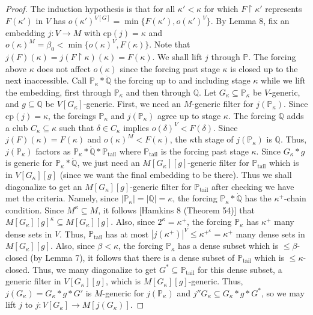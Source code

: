 \documentclass[10pt,leqno]{amsart}
\begin{document}
\begin{proof}
The induction hypothesis is that for all $\kappa' < \kappa$ for which $F \upharpoonright \kappa'$ represents $F(\kappa')$ in $V$ has $o(\kappa')^{V[G]} = \min\{F(\kappa'), o(\kappa')^V\}$. By Lemma 8, fix an embedding $j:V \to M$ with cp$(j) = \kappa$ and $o(\kappa)^M = \beta_0 < \min\{o(\kappa)^V,F(\kappa)\}$. Note that $j(F)(\kappa) = j(F\upharpoonright \kappa)(\kappa) = F(\kappa)$. We shall lift $j$ through $\mathbb{P}$. The forcing above $\kappa$ does not affect $o(\kappa)$ since the forcing past stage $\kappa$ is closed up to the next inaccessible. Call $\mathbb{P}_{\kappa}*\dot{\mathbb{Q}}$ the forcing up to and including stage $\kappa$ while we lift the embedding, first through $\mathbb{P}_{\kappa}$ and then through $\mathbb{Q}$. Let $G_{\kappa} \subseteq \mathbb{P}_{\kappa}$ be $V$-generic, and $g \subseteq \mathbb{Q}$ be $V[G_{\kappa}]$-generic. First, we need an $M$-generic filter for $j(\mathbb{P}_{\kappa})$. Since cp$(j) = \kappa$, the forcings $\mathbb{P}_{\kappa}$ and $j(\mathbb{P}_{\kappa})$ agree up to stage $\kappa$. The forcing $\mathbb{Q}$ adds a club $C_{\kappa} \subseteq \kappa$ such that $\delta \in C_{\kappa}$ implies $o(\delta)^V < F(\delta)$. Since $j(F)(\kappa) = F(\kappa)$ and $o(\kappa)^M < F(\kappa)$, the $\kappa$th stage of $j(\mathbb{P}_{\kappa})$ is $\mathbb{Q}$. Thus, $j(\mathbb{P}_{\kappa})$ factors as $\mathbb{P}_{\kappa}*\dot{\mathbb{Q}}*\mathbb{P}_{\mbox{tail}}$ where $\mathbb{P}_{\mbox{tail}}$ is the forcing past stage $\kappa$. Since $G_{\kappa}*g$ is generic for $\mathbb{P}_{\kappa}*\dot{\mathbb{Q}}$, we just need an $M[G_{\kappa}][g]$-generic filter for $\mathbb{P}_{\mbox{tail}}$ which is in 
$V[G_{\kappa}][g]$ (since we want the final embedding to be there). Thus we shall diagonalize to get an $M[G_{\kappa}][g]$-generic filter for $\mathbb{P}_{\mbox{tail}}$ after checking we have met the criteria. Namely, since $|\mathbb{P}_{\kappa}| = |\mathbb{Q}| = \kappa$, the forcing $\mathbb{P}_{\kappa}*\dot{\mathbb{Q}}$ has the $\kappa^+$-chain condition. Since $M^{\kappa} \subseteq M$, it follows [Hamkins 8 (Theorem 54)] that $M[G_{\kappa}][g]^{\kappa} \subseteq M[G_{\kappa}][g]$. Also, since $2^{\kappa} = \kappa^+$, the forcing $\mathbb{P}_{\kappa}$ has $\kappa^+$ many dense sets in $V$. Thus, $\mathbb{P}_{\mbox{tail}}$ has at most $|j(\kappa^+)|^V \le \kappa^{+^{\kappa}} = \kappa^+$ many dense sets in $M[G_{\kappa}][g]$. Also, since $\beta < \kappa$, the forcing $\mathbb{P}_{\kappa}$ has a dense subset which is $\le \beta$-closed (by Lemma 7), it follows that there is a dense subset of $\mathbb{P}_{\mbox{tail}}$ which is $\le \kappa$-closed. Thus, we many diagonalize to get $G^* \subseteq \mathbb{P}_{\mbox{tail}}$ for this dense subset, a generic filter in $V[G_{\kappa}][g]$, which is $M[G_{\kappa}][g]$-generic. Thus, $j(G_{\kappa}) = G_{\kappa}*g*G'$ is $M$-generic for $j(\mathbb{P}_{\kappa})$ and $j''G_{\kappa} \subseteq G_{\kappa}*g*G^*$, so we may lift $j$ to $j: V[G_{\kappa}] \to M[j(G_{\kappa})]$.


\end{proof}
\end{document}
